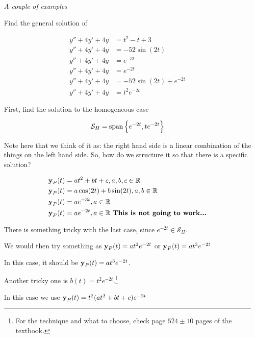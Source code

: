 	\begin{example}
		\textit{A couple of examples}

		Find the general solution of

		\begin{align}
			y'' + 4y' + 4y &= t^2 - t + 3\\
			y'' + 4y' + 4y &= -52\sin(2t)\\
			y'' + 4y' + 4y &= e^{-3t}\\
			y'' + 4y' + 4y &= e^{-2t}\\
			y'' + 4y' + 4y &= -52\sin(2t) + e^{-2t}\\
			y'' + 4y' + 4y &= t^2 e^{-2t}
		\end{align}
	\end{example}

	\begin{sol}
		First, find the solution to the homogeneous case

		\begin{equation}
			\mathcal{S}_H = \mathrm{span}\left\{e^{-2t}, te^{-2t}\right\}
		\end{equation}

		Note here that we think of it as: the right hand side is a linear combination of the things on the left hand side. So, how do we structure it so that there is a specific solution?

		\begin{align}
			\bm{\mathrm{y}}_P(t) &= at^2 + bt + c, a,b,c \in \mathbb{R}\\
			\bm{\mathrm{y}}_P(t) &= a \cos(2t) + b \sin(2t), a,b\in\mathbb{R}\\
			\bm{\mathrm{y}}_P(t) &= a e^{-3t}, a \in \mathbb{R}\\
			\bm{\mathrm{y}}_P(t) &= a e^{-2t}, a \in \mathbb{R} \text{ \textbf{This is not going to work...}}
		\end{align}

		There is something tricky with the last case, since $e^{-2t} \in \mathcal{S}_H$.
		
		We would then try something as $\bm{\mathrm{y}}_P(t) = at^2 e^{-2t}$ or $\bm{\mathrm{y}}_P(t) = at^3 e^{-2t}$
		
		In this case, it should be $\bm{\mathrm{y}}_P(t) = at^3 e^{-2t}$. 

		\bigskip

		Another tricky one is $b(t) = t^2 e^{-2t}$.\footnote{For the technique and what to choose, check page $524 \pm 10$ pages of the textbook.}

		In this case we use $\bm{\mathrm{y}}_P(t) = t^2 (at^2 + bt + c)e^{-2t}$
	\end{sol}


